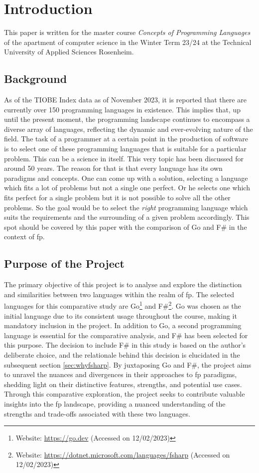 \chapter{Introduction}\label{chap:introduction}
This paper is written for the master course \textit{Concepts of Programming Languages} of the apartment of computer science in the Winter Term 23/24 at the Technical University of Applied Sciences Rosenheim.
    \section{Background}\label{sec:background}
As of the TIOBE Index data as of November 2023, it is reported that there are currently over 150 programming languages in existence. This implies that, up until the present moment, the programming landscape continues to encompass a diverse array of languages, reflecting the dynamic and ever-evolving nature of the field.\cite{tiobeindex} The task of a programmer at a certain point in the production of software is to select one of these programming languages that is suitable for a particular problem. This can be a science in itself. This very topic has been discussed for around 50 years.\cite{Tharp1982}
The reason for that is that every language has its own paradigms and concepts. One can come up with a solution, selecting a language which fits a lot of problems but not a single one perfect. Or he selects one which fits perfect for a single problem but it is not possible to solve all the other problems.
So the goal would be to select the \textit{right} programming language which suits the requirements and the surrounding of a given problem accordingly.
This spot should be covered by this paper with the comparison of Go and F\# in the context of \ac{fp}.

    \section{Purpose of the Project}\label{sec:purpose}
    The primary objective of this project is to analyse and explore the distinction and similarities between two languages within the realm of \ac{fp}. The selected languages for this comparative study are Go\footnote{Website: \url{https://go.dev} (Accessed on 12/02/2023)} and F\#\footnote{Website: \url{https://dotnet.microsoft.com/languages/fsharp} (Accessed on 12/02/2023)}. Go was chosen as the initial language due to its consistent usage throughout the course, making it mandatory inclusion in the project. 
    In addition to Go, a second programming language is essential for the comparative analysis, and F\# has been selected for this purpose. The decision to include F\# in this study is based on the author's deliberate choice, and the relationale behind this decision is elucidated in the subsequent section \ref{sec:whyfsharp}. By juxtaposing Go and F\#, the project aims to unravel the nuances and divergences in their approaches to \ac{fp} paradigms, shedding light on their distinctive features, strengths, and potential use cases. Through this comparative exploration, the project seeks to contribute valuable insights into the \ac{fp} landscape, providing a nuanced understanding of the strengths and trade-offs associated with these two languages.

